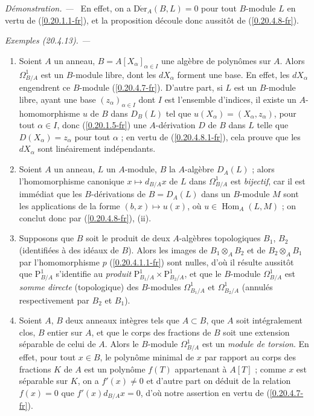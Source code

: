 \documentclass[10pt,oneside]{book}
\makeatletter
\newcommand{\sref}[1]{(\ref{#1})}
\newcommand{\setmanualcurrentlabel}[1]{\def\@currentlabel{#1}}
\newenvironment{examples}[1][]{%
  \setmanualcurrentlabel{#1}\par\medskip\noindent\textit{Exemples (#1). ---}\ }{\par}
\newenvironment{proof}{%
  \par\medskip\noindent\textit{Démonstration. ---\ }}{\par}
\makeatother
\begin{document}
\begin{proof}
En effet, on a $\operatorname{D\acute{e}r}_A(B,L)=0$ pour tout $B$-module
$L$ en vertu de \sref{0.20.1.1-fr}, et la proposition découle donc aussitôt
de \sref{0.20.4.8-fr}.
\end{proof}

\begin{examples}[20.4.13]
\label{0.20.4.13-fr}
\begin{enumerate}
  \item[\rm(i)] Soient $A$ un anneau,
  $B=A[X_\alpha]_{\alpha\in I}$ une algèbre de polynômes sur $A$. Alors
  $\Omega^1_{B/A}$ est un $B$-module libre, dont les $dX_\alpha$ forment une
  base. En effet, les $dX_\alpha$ engendrent ce $B$-module
  \sref{0.20.4.7-fr}. D'autre part, si $L$ est un $B$-module libre, ayant
  une base $(z_\alpha)_{\alpha\in I}$ dont $I$ est l'ensemble d'indices, il
  existe un $A$-homomorphisme $u$ de $B$ dans $D_B(L)$ tel que
  $u(X_\alpha)=(X_\alpha,z_\alpha)$, pour tout $\alpha\in I$, donc
  \sref{0.20.1.5-fr} une $A$-dérivation $D$ de $B$ dans $L$ telle que
  $D(X_\alpha)=z_\alpha$ pour tout $\alpha$ ; en vertu de
  \sref{0.20.4.8.1-fr}, cela prouve que les $dX_\alpha$ sont linéairement
  indépendants.
  \item[\rm(ii)] Soient $A$ un anneau, $L$ un $A$-module, $B$ la
  $A$-algèbre $D_A(L)$ ; alors l'homomorphisme canonique
  $x\mapsto d_{B/A}x$ de $L$ dans $\Omega^1_{B/A}$ est \emph{bijectif}, car
  il est immédiat que les $B$-dérivations de $B=D_A(L)$ dans un $B$-module
  $M$ sont les applications de la forme $(b,x)\mapsto u(x)$, où
  $u\in\operatorname{Hom}_A(L,M)$ ; on conclut donc par
  \sref{0.20.4.8-fr}, (ii).
  \item[\rm(iii)] Supposons que $B$ soit le produit de deux $A$-algèbres
  topologiques $B_1$, $B_2$ (identifiées à des idéaux de $B$). Alors les
  images de $B_1\otimes_A B_2$ et de $B_2\otimes_A B_1$ par l'homomorphisme
  $p$ \sref{0.20.4.1.1-fr} sont nulles, d'où il résulte aussitôt que
  $\mathrm{P}^1_{B/A}$ s'identifie au \emph{produit}
  $\mathrm{P}^1_{B_1/A}\times\mathrm{P}^1_{B_2/A}$, et que le $B$-module
  $\Omega^1_{B/A}$ est \emph{somme directe} (topologique) des $B$-modules
  $\Omega^1_{B_1/A}$ et $\Omega^1_{B_2/A}$ (annulés respectivement par
  $B_2$ et $B_1$).
  \item[\rm(iv)] Soient $A$, $B$ deux anneaux intègres tels que $A\subset
  B$, que $A$ soit intégralement clos, $B$ entier sur $A$, et que le corps
  des fractions de $B$ soit une extension séparable de celui de $A$. Alors
  le $B$-module $\Omega^1_{B/A}$ est un \emph{module de torsion}. En effet,
  pour tout $x\in B$, le polynôme minimal de $x$ par rapport au corps des
  fractions $K$ de $A$ est un polynôme $f(T)$ appartenant à $A[T]$ ; comme
  $x$ est séparable sur $K$, on a $f'(x)\neq0$ et d'autre part on déduit de
  la relation $f(x)=0$ que $f'(x)d_{B/A}x=0$, d'où notre assertion en vertu
  de \sref{0.20.4.7-fr}.
\end{enumerate}
\end{examples}
\end{document}
